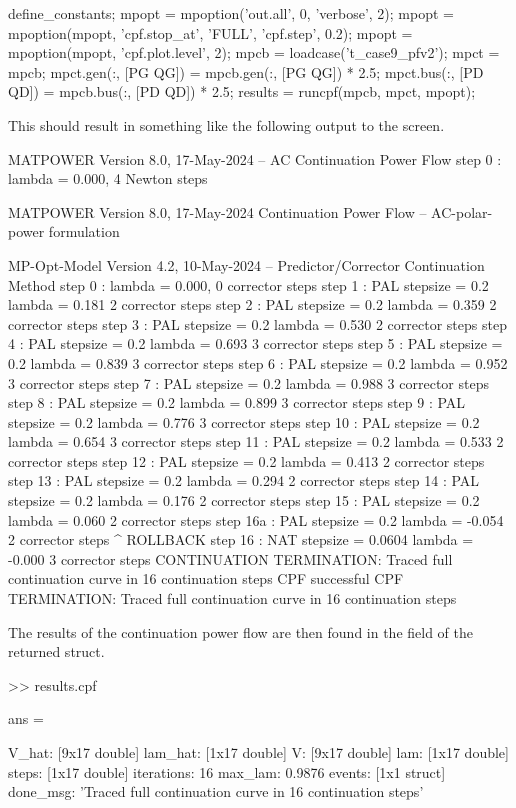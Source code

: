\documentclass[12pt]{article}
\newcommand{\code}[1]{{\relsize{-0.5}{\tt{{#1}}}}}  %
\newcommand{\results}[0]{\code{results}}
\numberwithin{equation}{section}
\numberwithin{table}{section}
\numberwithin{figure}{section}
\begin{document}
\begin{Code}
define_constants;
mpopt = mpoption('out.all', 0, 'verbose', 2);
mpopt = mpoption(mpopt, 'cpf.stop_at', 'FULL', 'cpf.step', 0.2);
mpopt = mpoption(mpopt, 'cpf.plot.level', 2);
mpcb = loadcase('t_case9_pfv2');                    %
mpct = mpcb;                                        %
mpct.gen(:, [PG QG]) = mpcb.gen(:, [PG QG]) * 2.5;  %
mpct.bus(:, [PD QD]) = mpcb.bus(:, [PD QD]) * 2.5;  %
results = runcpf(mpcb, mpct, mpopt);
\end{Code}
This should result in something like the following output to the screen.
\begin{Code}
MATPOWER Version 8.0, 17-May-2024 -- AC Continuation Power Flow
step   0  :                      lambda =  0.000,  4 Newton steps

MATPOWER Version 8.0, 17-May-2024
Continuation Power Flow -- AC-polar-power formulation

MP-Opt-Model Version 4.2, 10-May-2024 -- Predictor/Corrector Continuation Method
step   0  :                          lambda =  0.000,  0 corrector steps
step   1  : PAL stepsize = 0.2       lambda =  0.181   2 corrector steps
step   2  : PAL stepsize = 0.2       lambda =  0.359   2 corrector steps
step   3  : PAL stepsize = 0.2       lambda =  0.530   2 corrector steps
step   4  : PAL stepsize = 0.2       lambda =  0.693   3 corrector steps
step   5  : PAL stepsize = 0.2       lambda =  0.839   3 corrector steps
step   6  : PAL stepsize = 0.2       lambda =  0.952   3 corrector steps
step   7  : PAL stepsize = 0.2       lambda =  0.988   3 corrector steps
step   8  : PAL stepsize = 0.2       lambda =  0.899   3 corrector steps
step   9  : PAL stepsize = 0.2       lambda =  0.776   3 corrector steps
step  10  : PAL stepsize = 0.2       lambda =  0.654   3 corrector steps
step  11  : PAL stepsize = 0.2       lambda =  0.533   2 corrector steps
step  12  : PAL stepsize = 0.2       lambda =  0.413   2 corrector steps
step  13  : PAL stepsize = 0.2       lambda =  0.294   2 corrector steps
step  14  : PAL stepsize = 0.2       lambda =  0.176   2 corrector steps
step  15  : PAL stepsize = 0.2       lambda =  0.060   2 corrector steps
step  16a : PAL stepsize = 0.2       lambda = -0.054   2 corrector steps ^ ROLLBACK
step  16  : NAT stepsize = 0.0604    lambda = -0.000   3 corrector steps
CONTINUATION TERMINATION: Traced full continuation curve in 16 continuation steps
CPF successful
CPF TERMINATION: Traced full continuation curve in 16 continuation steps
\end{Code}
The results of the continuation power flow are then found in the \code{cpf} field of the returned \results{} struct.
\begin{Code}
>> results.cpf

ans = 

         V_hat: [9x17 double]
       lam_hat: [1x17 double]
             V: [9x17 double]
           lam: [1x17 double]
         steps: [1x17 double]
    iterations: 16
       max_lam: 0.9876
        events: [1x1 struct]
      done_msg: 'Traced full continuation curve in 16 continuation steps'
\end{Code}
\end{document}
